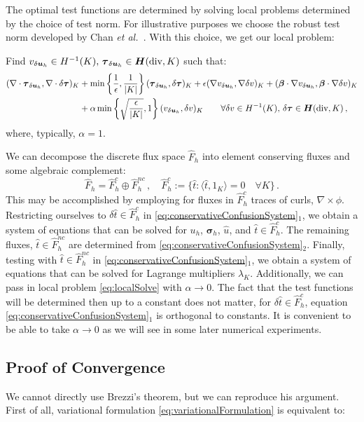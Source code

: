 \documentclass[letterpaper]{article}
\def\btau{\boldsymbol\tau}
\def\bsigma{\boldsymbol\sigma}
\def\bbeta{\boldsymbol\beta}
\newcommand{\bs}[1]{\boldsymbol{#1}}
\newcommand{\bfH}{\mbox{\boldmath $H$}}
\newcommand{\HdivK}{\bfH(\text{div},K)}
\newcommand{\HOneK}{H^{-1}(K)}
\newcommand{\vdeltau}{v_{\delta\bs u_h}}
\newcommand{\taudeltau}{\btau_{\delta\bs u_h}}
\def\etal{{\it et al.~}}
\begin{document}
The optimal test functions are determined by solving local problems determined
by the choice of test norm. For illustrative purposes we choose the robust
test norm developed by Chan \etal\cite{ChanHeuerThanhDemkowicz2012}. With this
choice, we get our local problem:

Find $\vdeltau\in\HOneK,\,\taudeltau\in\HdivK$ such that:
\begin{align}
(\nabla\cdot\taudeltau,\nabla\cdot\delta\btau)_K
&+\min\left\{\frac{1}{\epsilon},\frac{1}{|K|}\right\}(\taudeltau,\delta\btau)_K
+\epsilon(\nabla\vdeltau,\nabla \delta v)_K
+(\bbeta\cdot\nabla\vdeltau,\bbeta\cdot\nabla \delta v)_K\\
&+\alpha\min\left\{\sqrt{\frac{\epsilon}{|K|}},1\right\}(\vdeltau,\delta v)_K
\quad\quad\forall\delta v\in\HOneK,\,\delta\btau\in\HdivK\,,
\label{eq:localSolve}
\end{align}
where, typically, $\alpha=1$.

We can decompose the discrete flux space $\hat F_h$ into element conserving
fluxes and some algebraic complement:
\begin{equation}
\hat F_h=\hat F_h^c\oplus\hat F_h^{nc}\,,\quad\hat 
F_h^{c}:=\{\hat t:\langle\hat t,1_K\rangle=0\quad\forall K\}\,.
\label{eq:decomposition}
\end{equation}
This may be accomplished by employing for fluxes in $\hat F_h^{c}$ traces of
curls, $\nabla\times\phi$. Restricting ourselves to $\delta\hat t\in\hat
F_h^{c}$ in \eqref{eq:conservativeConfusionSystem}$_1$, we obtain a system  of
equations that can be solved for $u_h$, $\bsigma_h$, $\hat u$, and $\hat
t\in\hat F_h^c$. The remaining fluxes, $\hat t\in\hat F_h^{nc}$ are determined
from \eqref{eq:conservativeConfusionSystem}$_2$. Finally, testing with $\hat
t\in\hat F_h^{nc}$ in \eqref{eq:conservativeConfusionSystem}$_1$, we obtain a
system of equations that can be solved for Lagrange multipliers $\lambda_K$.
Additionally, we can pass in local problem \eqref{eq:localSolve} with
$\alpha\rightarrow0$. The fact that the test functions will be determined then
up to a constant does not matter, for $\delta\hat t\in\hat F_h^c$, equation
\eqref{eq:conservativeConfusionSystem}$_1$ is orthogonal to constants. 
It is convenient to be able to take $\alpha\rightarrow0$ as we will see in
some later numerical experiments.

\subsection{Proof of Convergence}
We cannot directly use Brezzi's theorem, but we can reproduce his argument.
First of all, variational formulation \eqref{eq:variationalFormulation} is
equivalent to:
\end{document}

